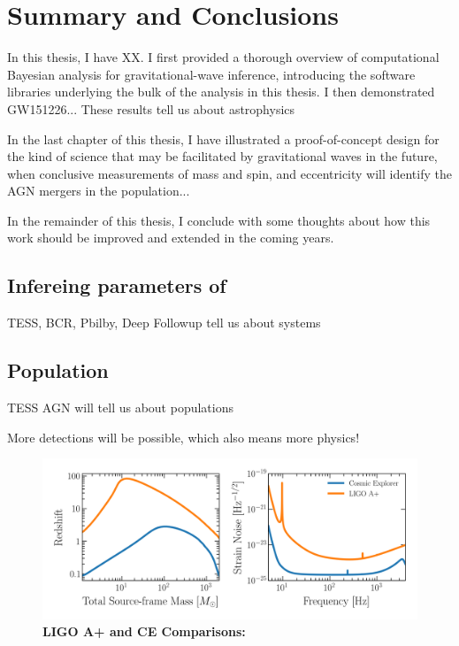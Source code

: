 \chapter{Summary and Conclusions}
\label{cp.conc}


In this thesis, I have XX.
I first provided a thorough overview of computational Bayesian analysis for gravitational-wave inference, introducing the software libraries underlying the bulk of the analysis in this thesis.
I then demonstrated GW151226...
These results tell us about astrophysics

In the last chapter of this thesis, I have illustrated a proof-of-concept design for the kind of science that may be facilitated by gravitational waves in the future, when conclusive measurements of mass and spin, and eccentricity will identify the AGN mergers in the population...

In the remainder of this thesis, I conclude with some thoughts about how this work should be improved and extended in the coming years.

\section{Infereing parameters of }

TESS, BCR, Pbilby, Deep Followup tell us about systems

\section{Population}
TESS AGN will tell us about populations


More detections will be possible, which also means more physics! 
\begin{figure}
\begin{center}
  \centerline{\includegraphics[width=1.\linewidth]{src/figures/ligo_vs_ce.png}}
  \caption{\textbf{LIGO A+ and CE Comparisons:}  }
  \label{fig:ligo_vs_ce}
\end{center}
\end{figure}



